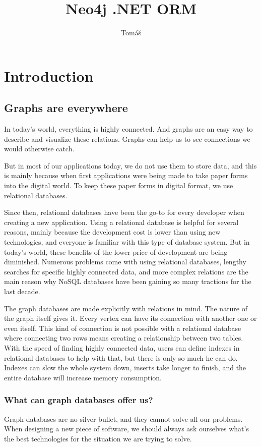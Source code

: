 \documentclass[thesis=M,english]{FITthesis}[2019/12/23]
\title{Neo4j .NET ORM}
\author{Tomáš} %
\begin{document}

\chapter{Introduction}

\section{Graphs are everywhere}
In today's world, everything is highly connected. And graphs are an easy way to describe and visualize these relations. Graphs can help us to see connections we would otherwise catch.

But in most of our applications today, we do not use them to store data, and this is mainly because when first applications were being made to take paper forms into the digital world. To keep these paper forms in digital format, we use relational databases.

Since then, relational databases have been the go-to for every developer when creating a new application. Using a relational database is helpful for several reasons, mainly because the development cost is lower than using new technologies, and everyone is familiar with this type of database system. But in today's world, these benefits of the lower price of development are being diminished. Numerous problems come with using relational databases, lengthy searches for specific highly connected data, and more complex relations are the main reason why NoSQL databases have been gaining so many tractions for the last decade.

The graph databases are made explicitly with relations in mind. The nature of the graph itself gives it. Every vertex can have its connection with another one or even itself. This kind of connection is not possible with a relational database where connecting two rows means creating a relationship between two tables. With the speed of finding highly connected data, users can define indexes in relational databases to help with that, but there is only so much he can do. Indexes can slow the whole system down, inserts take longer to finish, and the entire database will increase memory consumption.

\subsection{What can graph databases offer us?}
Graph databases are no silver bullet, and they cannot solve all our problems. When designing a new piece of software, we should always ask ourselves what's the best technologies for the situation we are trying to solve.
\end{document}

